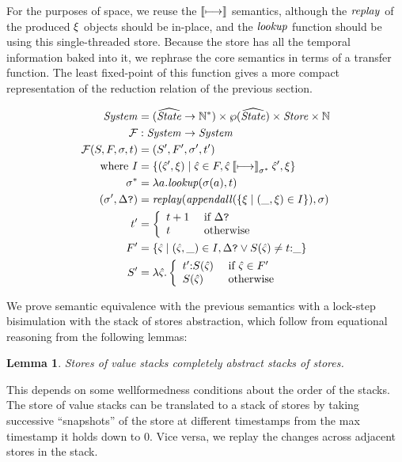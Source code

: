 \documentclass[preprint,onecolumn,9pt]{sigplanconf} %
\newtheorem{lemma}{Lemma}
\begin{document}
For the purposes of space, we reuse the $\mathbin{\llbracket\mathbin{\longmapsto}\rrbracket}$ semantics,
although the $\mathit{replay}$ of the produced $\xi$ objects should be
in-place, and the $\mathit{lookup}$ function should be using this
single-threaded store.  Because the store has all the temporal
information baked into it, we rephrase the core semantics in terms of
a transfer function. The least fixed-point of this function gives a
more compact representation of the reduction relation of the previous
section.

\begin{align*}
\mathit{System} &= (\widehat{\mathit{State}} \to {{\mathbb N}}^*) \times \wp(\widehat{\mathit{State}}) \times \mathit{Store} \times {\mathbb N} \\
{\mathcal F} &: \mathit{System} \to \mathit{System} \\
{\mathcal F}(S,F, \sigma,t) &= (S',F',\sigma', t') \\
\text{ where }
I &= \{(\hat{\varsigma}',\xi) \mid
       \hat{\varsigma} \in F,
       \hat{\varsigma} \mathbin{\llbracket\mathbin{\longmapsto}\rrbracket}_{\sigma^*} \hat{\varsigma}',\xi\} \\
\sigma^* &= \lambda a.\mathit{lookup}(\sigma(a),t) \\
(\sigma', \Delta\mbox{{\tt ?}}) &= \mathit{replay}(\mathit{appendall}(\{\xi \mid (\_,\xi) \in I\}),\sigma) \\
t' &= \left\{\begin{array}{ll} t+1 & \text{ if } \Delta\mbox{{\tt ?}} \\
              t   & \text{ otherwise}
             \end{array}\right. \\
F' &= \{\hat{\varsigma} \mid (\hat{\varsigma},\_) \in I, \Delta\mbox{{\tt ?}} \vee S(\hat{\varsigma}) \neq t {\tt :} \_\} \\
S' &= \lambda \hat{\varsigma}. \left\{\begin{array}{ll}
                               t' {\tt :} S(\hat{\varsigma}) & \text{ if } \hat{\varsigma} \in F' \\
                               S(\hat{\varsigma}) & \text{ otherwise}
                             \end{array}\right.
\end{align*}

We prove semantic equivalence with the previous semantics with a
lock-step bisimulation with the stack of stores abstraction, which
follow from equational reasoning from the following lemmas:

\begin{lemma}
Stores of value stacks completely abstract stacks of stores.
\end{lemma}
This depends on some wellformedness conditions about the order of the
stacks. The store of value stacks can be translated to a stack of
stores by taking successive ``snapshots'' of the store at different
timestamps from the max timestamp it holds down to 0. Vice versa, we
replay the changes across adjacent stores in the stack.
\end{document}
